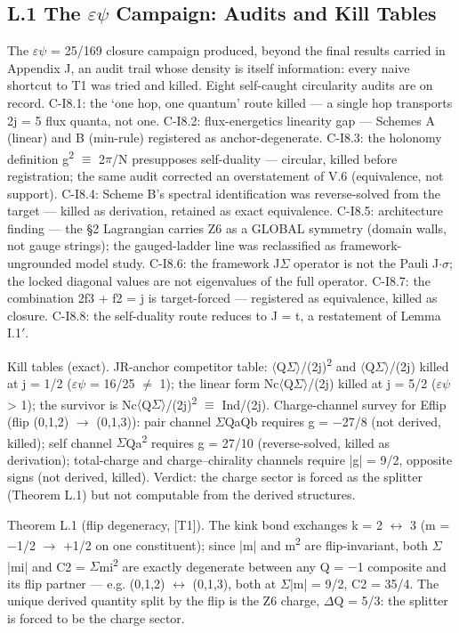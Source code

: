 \documentclass[11pt,letterpaper]{article}
\begin{document}
\subsection*{L.1  The $\varepsilon$$\psi$ Campaign: Audits and Kill Tables}

\noindent The $\varepsilon$$\psi$ = 25/169 closure campaign produced, beyond the final results carried in Appendix J, an audit trail whose density is itself information: every naive shortcut to T1 was tried and killed. Eight self-caught circularity audits are on record. C-I8.1: the `one hop, one quantum' route killed --- a single hop transports 2j = 5 flux quanta, not one. C-I8.2: flux-energetics linearity gap --- Schemes A (linear) and B (min-rule) registered as anchor-degenerate. C-I8.3: the holonomy definition g\textsuperscript{2} $\equiv$ 2$\pi$/N presupposes self-duality --- circular, killed before registration; the same audit corrected an overstatement of V.6 (equivalence, not support). C-I8.4: Scheme B's spectral identification was reverse-solved from the target --- killed as derivation, retained as exact equivalence. C-I8.5: architecture finding --- the §2 Lagrangian carries Z6 as a GLOBAL symmetry (domain walls, not gauge strings); the gauged-ladder line was reclassified as framework-ungrounded model study. C-I8.6: the framework J$\Sigma$ operator is not the Pauli J$\cdot$$\sigma$; the locked diagonal values are not eigenvalues of the full operator. C-I8.7: the combination 2f3 + f2 = j is target-forced --- registered as equivalence, killed as closure. C-I8.8: the self-duality route reduces to J = t, a restatement of Lemma I.1$'$.

\noindent Kill tables (exact). JR-anchor competitor table: $\langle$Q$\Sigma$$\rangle$/(2j)\textsuperscript{2} and $\langle$Q$\Sigma$$\rangle$/(2j) killed at j = 1/2 ($\varepsilon$$\psi$ = 16/25 $\ne$ 1); the linear form Nc$\langle$Q$\Sigma$$\rangle$/(2j) killed at j = 5/2 ($\varepsilon$$\psi$ > 1); the survivor is Nc$\langle$Q$\Sigma$$\rangle$/(2j)\textsuperscript{2} $\equiv$ Ind/(2j). Charge-channel survey for Eflip (flip (0,1,2) $\to$ (0,1,3)): pair channel $\Sigma$QaQb requires g = $-$27/8 (not derived, killed); self channel $\Sigma$Qa\textsuperscript{2} requires g = 27/10 (reverse-solved, killed as derivation); total-charge and charge--chirality channels require |g| = 9/2, opposite signs (not derived, killed). Verdict: the charge sector is forced as the splitter (Theorem L.1) but not computable from the derived structures.

\noindent Theorem L.1 (flip degeneracy, [T1]). The kink bond exchanges k = 2 $\leftrightarrow$ 3 (m = $-$1/2 $\to$ +1/2 on one constituent); since |m| and m\textsuperscript{2} are flip-invariant, both $\Sigma$|mi| and C2 = $\Sigma$mi\textsuperscript{2} are exactly degenerate between any Q = $-$1 composite and its flip partner --- e.g. (0,1,2) $\leftrightarrow$ (0,1,3), both at $\Sigma$|m| = 9/2, C2 = 35/4. The unique derived quantity split by the flip is the Z6 charge, $\Delta$Q = 5/3: the splitter is forced to be the charge sector.
\end{document}
